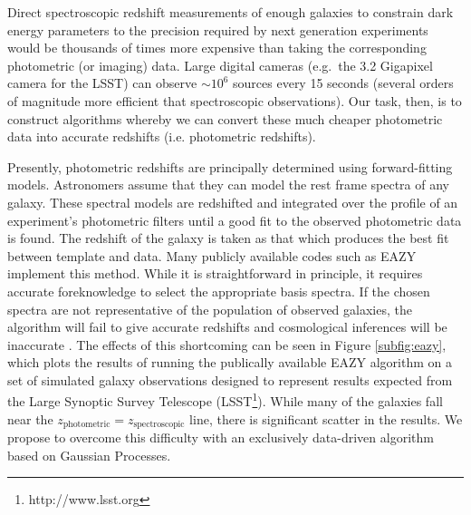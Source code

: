 \documentclass[useAMS,usenatbib,tightenlines,11pt,preprint]{aastex}
\begin{document}
Direct spectroscopic redshift measurements of enough galaxies to
constrain dark energy parameters to the precision required by next
generation experiments would be thousands of times more expensive than
taking the corresponding photometric (or imaging) data.  Large digital
cameras (e.g.\ the 3.2 Gigapixel camera for the LSST) can observe
$\sim 10^6$ sources every 15 seconds (several orders of magnitude more
efficient that spectroscopic observations). Our task, then, is to
construct algorithms whereby we can convert these much cheaper
photometric data into accurate redshifts (i.e. photometric redshifts).

Presently, photometric redshifts are principally determined using
forward-fitting models.  Astronomers assume that they can model the rest frame
spectra of any galaxy.  These spectral models are
redshifted and integrated over the profile of an experiment's
photometric filters until a good fit to the observed photometric data is
found.  The redshift of the galaxy is taken as that which produces the best fit
between template and data.  Many publicly available codes such as 
EAZY \cite{eazy} implement this method.  
While it is straightforward in principle, it requires
accurate foreknowledge to select the appropriate basis spectra.  If the chosen
spectra are not representative of the population of observed
galaxies, the algorithm will fail to give accurate redshifts and cosmological
inferences will be inaccurate \cite{budavari2008}.  The effects of this
shortcoming can be seen in Figure \ref{subfig:eazy}, which plots the results
of running the publically available EAZY algorithm \cite{eazy} on a set of
simulated galaxy observations designed to represent results expected from the
Large Synoptic Survey Telescope (LSST\footnote{http://www.lsst.org}).
While many of the galaxies fall near the
$z_\text{photometric}=z_\text{spectroscopic}$ line, there is significant scatter
in the results.  We propose to overcome this difficulty with an exclusively
data-driven algorithm based on Gaussian Processes.
\end{document}
